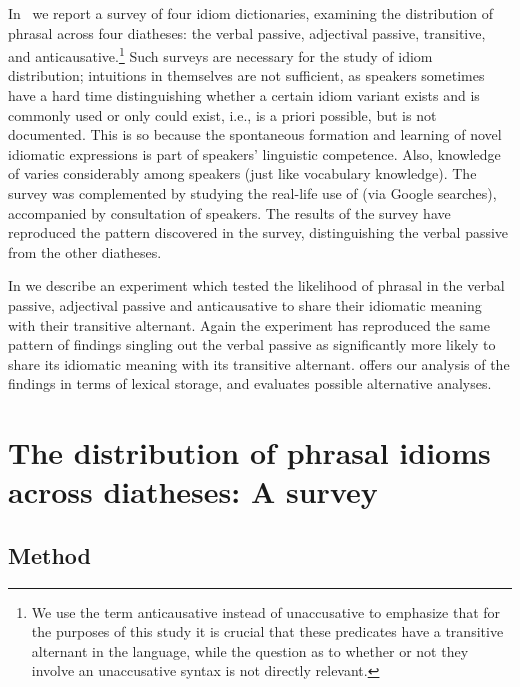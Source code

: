\documentclass[output=paper]{langsci/langscibook}
\begin{document}
In~ we report a survey of four  idiom dictionaries,
examining the distribution of phrasal  across four diatheses: the verbal
passive, adjectival passive, transitive, and anticausative.\footnote{We use the
    term anticausative instead of unaccusative to emphasize that for the
    purposes of this study it is crucial that these predicates have a
transitive alternant in the language, while the question as to whether or not
they involve an unaccusative syntax is not directly relevant.} Such surveys are
necessary for the study of idiom distribution; intuitions in themselves are not
sufficient, as speakers sometimes have a hard time distinguishing whether a
certain idiom variant exists and is commonly used or only could exist, i.e., is
a priori possible, but is not documented. This is so because the spontaneous
formation and learning of novel idiomatic expressions is part of speakers’
linguistic competence. Also, knowledge of  varies considerably among
speakers (just like vocabulary knowledge). The survey was complemented by
studying the real-life use of  (via Google searches), accompanied by
consultation of speakers. The results of the survey have reproduced the pattern
discovered in the  survey, distinguishing the verbal passive from
the other diatheses.

In  we describe an experiment which tested the likelihood of
phrasal  in the verbal passive, adjectival passive and anticausative to
share their idiomatic meaning with their transitive alternant. Again the
experiment has reproduced the same pattern of findings singling out the verbal
passive as significantly more likely to share its idiomatic meaning with its
transitive alternant.  offers our analysis of the findings
in terms of lexical storage, and  evaluates possible
alternative analyses.

\section{The distribution of phrasal idioms across diatheses: A
survey}\label{sec:20.2}

\subsection{Method} %
\end{document}
